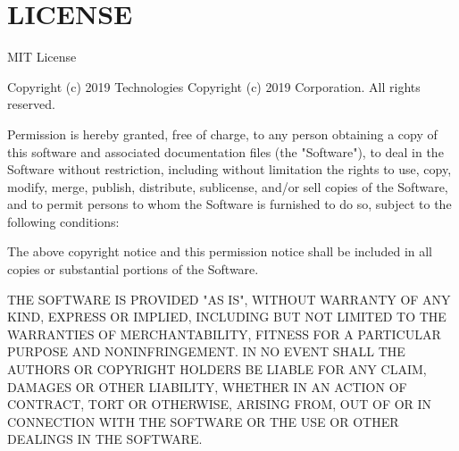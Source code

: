 \chapter{LICENSE}
\hypertarget{md__library_2_package_cache_2com_8unity_8ide_8visualstudio_0d2_80_822_2_l_i_c_e_n_s_e}{}\label{md__library_2_package_cache_2com_8unity_8ide_8visualstudio_0d2_80_822_2_l_i_c_e_n_s_e}
MIT License

Copyright (c) 2019  Technologies Copyright (c) 2019  Corporation. All rights reserved.

Permission is hereby granted, free of charge, to any person obtaining a copy of this software and associated documentation files (the "{}\+Software"{}), to deal in the Software without restriction, including without limitation the rights to use, copy, modify, merge, publish, distribute, sublicense, and/or sell copies of the Software, and to permit persons to whom the Software is furnished to do so, subject to the following conditions\+:

The above copyright notice and this permission notice shall be included in all copies or substantial portions of the Software.

THE SOFTWARE IS PROVIDED "{}\+AS IS"{}, WITHOUT WARRANTY OF ANY KIND, EXPRESS OR IMPLIED, INCLUDING BUT NOT LIMITED TO THE WARRANTIES OF MERCHANTABILITY, FITNESS FOR A PARTICULAR PURPOSE AND NONINFRINGEMENT. IN NO EVENT SHALL THE AUTHORS OR COPYRIGHT HOLDERS BE LIABLE FOR ANY CLAIM, DAMAGES OR OTHER LIABILITY, WHETHER IN AN ACTION OF CONTRACT, TORT OR OTHERWISE, ARISING FROM, OUT OF OR IN CONNECTION WITH THE SOFTWARE OR THE USE OR OTHER DEALINGS IN THE SOFTWARE. 